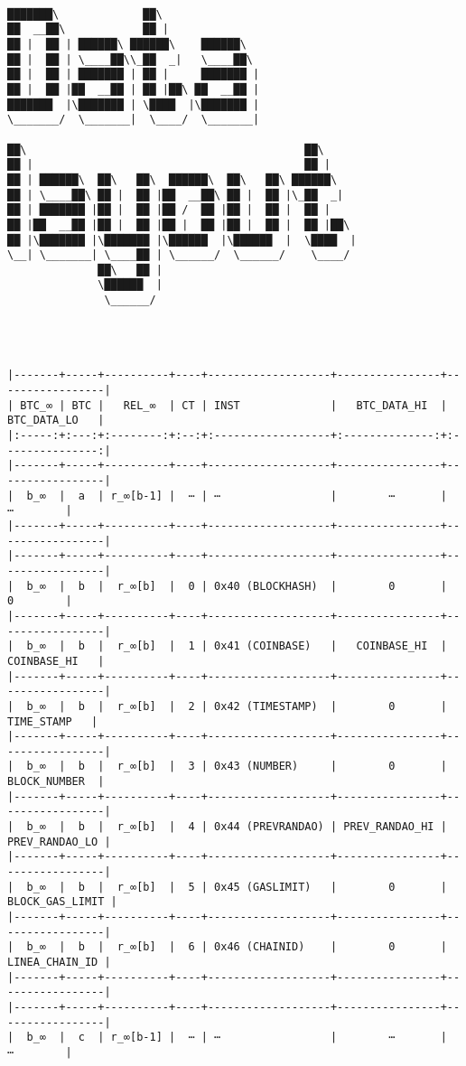 \documentclass[varwidth=\maxdimen,margin=0.5cm,multi={verbatim}]{standalone}
\begin{document}
\begin{verbatim}

███████\             ██\                              
██  __██\            ██ |                             
██ |  ██ | ██████\ ██████\    ██████\                 
██ |  ██ | \____██\\_██  _|   \____██\                
██ |  ██ | ███████ | ██ |     ███████ |               
██ |  ██ |██  __██ | ██ |██\ ██  __██ |               
███████  |\███████ | \████  |\███████ |               
\_______/  \_______|  \____/  \_______|               
                                                      
██\                                           ██\     
██ |                                          ██ |    
██ | ██████\  ██\   ██\  ██████\  ██\   ██\ ██████\   
██ | \____██\ ██ |  ██ |██  __██\ ██ |  ██ |\_██  _|  
██ | ███████ |██ |  ██ |██ /  ██ |██ |  ██ |  ██ |    
██ |██  __██ |██ |  ██ |██ |  ██ |██ |  ██ |  ██ |██\ 
██ |\███████ |\███████ |\██████  |\██████  |  \████  |
\__| \_______| \____██ | \______/  \______/    \____/ 
              ██\   ██ |                              
              \██████  |                              
               \______/




|-------+-----+----------+----+-------------------+----------------+-----------------|
| BTC_∞ | BTC |   REL_∞  | CT | INST              |   BTC_DATA_HI  |   BTC_DATA_LO   |
|:-----:+:---:+:--------:+:--:+:------------------+:--------------:+:---------------:|
|-------+-----+----------+----+-------------------+----------------+-----------------|
|  b_∞  |  a  | r_∞[b-1] |  ⋯ | ⋯                 |        ⋯       |        ⋯        |
|-------+-----+----------+----+-------------------+----------------+-----------------|
|-------+-----+----------+----+-------------------+----------------+-----------------|
|  b_∞  |  b  |  r_∞[b]  |  0 | 0x40 (BLOCKHASH)  |        0       |        0        |
|-------+-----+----------+----+-------------------+----------------+-----------------|
|  b_∞  |  b  |  r_∞[b]  |  1 | 0x41 (COINBASE)   |   COINBASE_HI  |   COINBASE_HI   |
|-------+-----+----------+----+-------------------+----------------+-----------------|
|  b_∞  |  b  |  r_∞[b]  |  2 | 0x42 (TIMESTAMP)  |        0       |    TIME_STAMP   |
|-------+-----+----------+----+-------------------+----------------+-----------------|
|  b_∞  |  b  |  r_∞[b]  |  3 | 0x43 (NUMBER)     |        0       |   BLOCK_NUMBER  |
|-------+-----+----------+----+-------------------+----------------+-----------------|
|  b_∞  |  b  |  r_∞[b]  |  4 | 0x44 (PREVRANDAO) | PREV_RANDAO_HI |  PREV_RANDAO_LO |
|-------+-----+----------+----+-------------------+----------------+-----------------|
|  b_∞  |  b  |  r_∞[b]  |  5 | 0x45 (GASLIMIT)   |        0       | BLOCK_GAS_LIMIT |
|-------+-----+----------+----+-------------------+----------------+-----------------|
|  b_∞  |  b  |  r_∞[b]  |  6 | 0x46 (CHAINID)    |        0       |  LINEA_CHAIN_ID |
|-------+-----+----------+----+-------------------+----------------+-----------------|
|-------+-----+----------+----+-------------------+----------------+-----------------|
|  b_∞  |  c  | r_∞[b-1] |  ⋯ | ⋯                 |        ⋯       |        ⋯        |


\end{verbatim}
\end{document}
